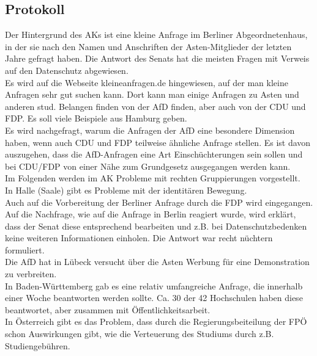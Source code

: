   \subsection*{Protokoll}
    Der Hintergrund des AKs ist eine kleine Anfrage im Berliner Abgeordnetenhaus, in der sie nach den Namen und Anschriften der Asten-Mitglieder der letzten Jahre gefragt haben. Die Antwort des Senats hat die meisten Fragen mit Verweis auf den Datenschutz abgewiesen. \\

    Es wird auf die Webseite kleineanfragen.de hingewiesen, auf der man kleine Anfragen sehr gut suchen kann. Dort kann man einige Anfragen zu Asten und anderen stud. Belangen finden von der AfD finden, aber auch von der CDU und FDP. Es soll viele Beispiele aus Hamburg geben. \\

    Es wird nachgefragt, warum die Anfragen der AfD eine besondere Dimension haben, wenn auch CDU und FDP teilweise ähnliche Anfrage stellen. Es ist davon auszugehen, dass die AfD-Anfragen eine Art Einschüchterungen sein sollen und bei CDU/FDP von einer Nähe zum Grundgesetz ausgegangen werden kann. \\

    Im Folgenden werden im AK Probleme mit rechten Gruppierungen vorgestellt. \\

    In Halle (Saale) gibt es Probleme mit der identitären Bewegung. \\

    Auch auf die Vorbereitung der Berliner Anfrage durch die FDP wird eingegangen. \\

    Auf die Nachfrage, wie auf die Anfrage in Berlin reagiert wurde, wird erklärt, dass der Senat diese entsprechend bearbeiten und z.B. bei Datenschutzbedenken keine weiteren Informationen einholen. Die Antwort war recht nüchtern formuliert. \\

    Die AfD hat in Lübeck versucht über die Asten Werbung für eine Demonstration zu verbreiten. \\

    In Baden-Württemberg gab es eine relativ umfangreiche Anfrage, die innerhalb einer Woche beantworten werden sollte. Ca. 30 der 42 Hochschulen haben diese beantwortet, aber zusammen mit Öffentlichkeitsarbeit. \\

    In Österreich gibt es das Problem, dass durch die Regierungsbeiteilung der FPÖ schon Auswirkungen gibt, wie die Verteuerung des Studiums durch z.B. Studiengebühren. \\

